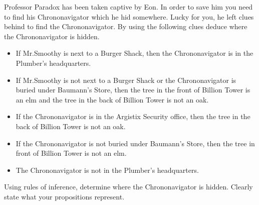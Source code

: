 \documentclass[12pt]{exam}
\begin{document}
\begin{questions}
    \question 
    Professor Paradox has been taken captive by Eon. In order to save him you need to find his Chrononavigator which he hid somewhere.
    Lucky for you, he left clues behind to find the Chrononavigator. By using the following clues deduce where the Chrononavigator is hidden.
    \begin{itemize}
        \item If Mr.Smoothy is next to a Burger Shack, then the Chrononavigator is in the Plumber's headquarters.
        \item If Mr.Smoothy is not next to a Burger Shack or the Chrononavigator is buried under Baumann's Store, then the tree in the front of Billion Tower is an elm and the tree in the back of Billion Tower is not an oak.
        \item If the Chrononavigator is in the Argistix Security office, then the tree in the back of Billion Tower is not an oak.
        \item If the Chrononavigator is not buried under Baumann's Store, then the tree in front of Billion Tower is not an elm.
        \item The Chrononavigator is not in the Plumber's headquarters.
    \end{itemize}
   
    Using rules of inference, determine where the Chrononavigator is hidden. Clearly state what your propositions
    represent.
    \begin{solution}


\end{solution}
\end{questions}
\end{document}
